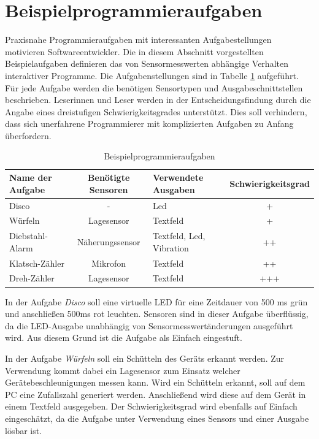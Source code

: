 \documentclass[11pt,a4paper]{report}
\begin{document}
\section{Beispielprogrammieraufgaben}\label{sec:activities}
Praxisnahe Programmieraufgaben mit interessanten Aufgabestellungen motivieren Softwareentwickler.
Die in diesem Abschnitt vorgestellten Beispielaufgaben definieren das von Sensormesswerten abhängige Verhalten interaktiver Programme.
Die Aufgabenstellungen sind in Tabelle \ref{tab:excercises} aufgeführt.
Für jede Aufgabe werden die benötigen Sensortypen und Ausgabeschnittstellen beschrieben.
Leserinnen und Leser werden in der Entscheidungsfindung durch die Angabe eines dreistufigen Schwierigkeitsgrades unterstützt.
Dies soll verhindern, dass sich unerfahrene Programmierer mit komplizierten Aufgaben zu Anfang überfordern.
\begin{table}[htbp]
  \centering
  \begin{tabular}{|l|c|p{2cm}|c|}
      \hline
      \textbf{Name der Aufgabe} & \textbf{Benötigte Sensoren} & \textbf{Verwendete Ausgaben} & \textbf{Schwierigkeitsgrad} \\
      \hline
      Disco & - & Led & + \\
      \hline
      Würfeln & Lagesensor & Textfeld &+ \\
      \hline
      Diebstahl-Alarm & Näherungssensor & Textfeld, Led, Vibration & ++ \\
      \hline
      Klatsch-Zähler & Mikrofon & Textfeld & ++ \\
      \hline
      Dreh-Zähler & Lagesensor & Textfeld & +++ \\
      \hline
  \end{tabular}
  \caption{Beispielprogrammieraufgaben}
  \label{tab:excercises}
\end{table}

In der Aufgabe \textit{Disco} soll eine virtuelle LED für eine Zeitdauer von 500 ms grün und anschließen 500ms rot leuchten.
Sensoren sind in dieser Aufgabe überflüssig, da die LED-Ausgabe unabhängig von Sensormesswertänderungen ausgeführt wird.
Aus diesem Grund ist die Aufgabe als Einfach eingestuft.

In der Aufgabe \textit{Würfeln} soll ein Schütteln des Geräts erkannt werden.
Zur Verwendung kommt dabei ein Lagesensor zum Einsatz welcher Gerätebeschleunigungen messen kann.
Wird ein Schütteln erkannt, soll auf dem PC eine Zufallszahl generiert werden.
Anschließend wird diese auf dem Gerät in einem Textfeld ausgegeben.
Der Schwierigkeitsgrad wird ebenfalls auf Einfach eingeschätzt, da die Aufgabe unter Verwendung eines Sensors und einer Ausgabe lösbar ist.
\end{document}
